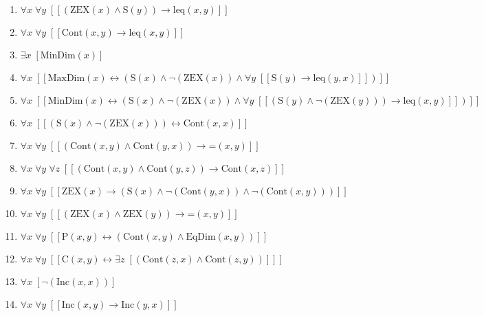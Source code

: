 \documentclass{article}
\begin{document}
\begin{enumerate}
\item $\forall x\; \forall y\;  \left[ \left[ \left(\textrm{ZEX}(x) \land \textrm{S}(y)\right) \rightarrow \textrm{leq}(x,y) \right] \right]$
\item $\forall x\; \forall y\;  \left[ \left[ \textrm{Cont}(x,y) \rightarrow \textrm{leq}(x,y) \right] \right]$
\item $\exists x\;  \left[ \textrm{MinDim}(x) \right]$
\item $\forall x\;  \left[ \left[ \textrm{MaxDim}(x) \leftrightarrow \left(\textrm{S}(x) \land \neg \left(\textrm{ZEX}(x)\right) \land \forall y\;  \left[ \left[ \textrm{S}(y) \rightarrow \textrm{leq}(y,x) \right] \right]\right) \right] \right]$
\item $\forall x\;  \left[ \left[ \textrm{MinDim}(x) \leftrightarrow \left(\textrm{S}(x) \land \neg \left(\textrm{ZEX}(x)\right) \land \forall y\;  \left[ \left[ \left(\textrm{S}(y) \land \neg \left(\textrm{ZEX}(y)\right)\right) \rightarrow \textrm{leq}(x,y) \right] \right]\right) \right] \right]$
\item $\forall x\;  \left[ \left[ \left(\textrm{S}(x) \land \neg \left(\textrm{ZEX}(x)\right)\right) \leftrightarrow \textrm{Cont}(x,x) \right] \right]$
\item $\forall x\; \forall y\;  \left[ \left[ \left(\textrm{Cont}(x,y) \land \textrm{Cont}(y,x)\right) \rightarrow \textrm{=}(x,y) \right] \right]$
\item $\forall x\; \forall y\; \forall z\;  \left[ \left[ \left(\textrm{Cont}(x,y) \land \textrm{Cont}(y,z)\right) \rightarrow \textrm{Cont}(x,z) \right] \right]$
\item $\forall x\; \forall y\;  \left[ \left[ \textrm{ZEX}(x) \rightarrow \left(\textrm{S}(x) \land \neg \left(\textrm{Cont}(y,x)\right) \land \neg \left(\textrm{Cont}(x,y)\right)\right) \right] \right]$
\item $\forall x\; \forall y\;  \left[ \left[ \left(\textrm{ZEX}(x) \land \textrm{ZEX}(y)\right) \rightarrow \textrm{=}(x,y) \right] \right]$
\item $\forall x\; \forall y\;  \left[ \left[ \textrm{P}(x,y) \leftrightarrow \left(\textrm{Cont}(x,y) \land \textrm{EqDim}(x,y)\right) \right] \right]$
\item $\forall x\; \forall y\;  \left[ \left[ \textrm{C}(x,y) \leftrightarrow \exists z\;  \left[ \left(\textrm{Cont}(z,x) \land \textrm{Cont}(z,y)\right) \right] \right] \right]$
\item $\forall x\;  \left[ \neg \left(\textrm{Inc}(x,x)\right) \right]$
\item $\forall x\; \forall y\;  \left[ \left[ \textrm{Inc}(x,y) \rightarrow \textrm{Inc}(y,x) \right] \right]$

\end{enumerate}
\end{document}

